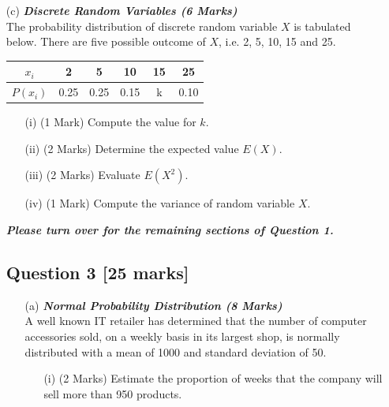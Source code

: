 \documentclass[a4paper,12pt]{article}
\begin{document}
\begin{itemize}
\item[(c)] \textbf{\textit{Discrete Random Variables (6 Marks)}}\\
 The probability distribution of discrete random variable $X$ is tabulated below. There are five possible outcome of $X$, i.e. 2, 5, 10, 15 and 25.
\begin{center}
\begin{tabular}{|c||c|c|c|c|c|}
\hline
$x_i$ & 2 &  5 & 10 & 15 & 25  \\ \hline
$P(x_i)$ & 0.25 & 0.25 & 0.15 & \mbox{ k }  & 0.10 \\ \hline
\end{tabular}
\end{center}

\begin{itemize}
\item[(i)] (1 Mark) Compute the value for $k$.
\item[(ii)] (2 Marks) Determine the expected value $E(X)$.
\item[(iii)] (2 Marks) Evaluate $E(X^2)$.
\item[(iv)] (1 Mark) Compute the variance of random variable $X$.
\end{itemize}
{
\normalsize
\textit{\textbf{Please turn over for the remaining sections of Question 1.}}
}





\newpage

\subsection*{Question 3 [25 marks]}



\begin{itemize}
\item[(a)] \textbf{\textit{Normal Probability Distribution (8 Marks)}}\\
A well known IT retailer has determined that the number of computer accessories sold, on a weekly basis in its largest shop, is normally distributed with a mean of 1000 and standard deviation of 50.
\begin{itemize}
\item[(i)] (2 Marks) Estimate the proportion of weeks that the company will sell more than 950 products.


\end{itemize}
\end{itemize}
\end{itemize}
\end{document}
